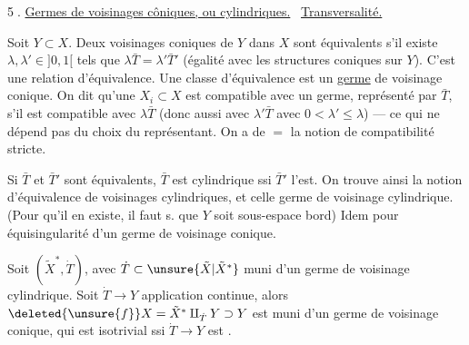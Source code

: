 \textcircled{5.}
\uline{Germes de voisinages côniques, ou cylindriques.}
\ \uline{Transversalité.}

Soit $Y\subset X$. Deux voisinages coniques
 de $Y$ dans
$X$ sont équivalents s'il existe $\lambda,\lambda'\in]0,1[$ tels
que $\lambda\bar T=\lambda'\bar T'$ (égalité 
avec les structures
coniques sur $Y$). C'est une relation d'équivalence.
\margin{$\varepsilon\in]0,1[$, alors pour
$\varepsilon\lambda\bar T=\varepsilon\lambda'\bar T'$}
Une classe d'équivalence est un \uline{germe} de
voisinage conique. On dit qu'une $X_i\subset X$
est compatible avec un germe, représenté par $\bar T$,
s'il est \inserted{$\exists\lambda\in]0,1[$ \deleted{\unsure{telle}}
tel qu'il soit} compatible avec $\lambda\bar T$
(donc aussi avec $\lambda'\bar T$
avec $0<\lambda'\leq\lambda$) --- ce qui ne dépend pas du
choix du représentant. On a de $=$ la
notion de compatibilité stricte.

Si $\bar T$ et $\bar T'$ sont équivalents, 
$\bar T$ est
cylindrique ssi $\bar T'$ l'est. On trouve ainsi la notion
d'équivalence de voisinages cylindriques, et celle 
germe de voisinage cylindrique. (Pour qu'il
en existe, il faut s. que $Y$ soit sous-espace bord)
Idem pour équisingularité d'un germe de
voisinage conique.

Soit $(\tilde X^*,\dot T)$, avec $\dot T\subset\unsure{\tilde X|\tilde X^*}$ muni d'un
germe de voisinage cylindrique. Soit $\dot T\longrightarrow Y$
application continue, alors
$\deleted{\unsure{f}}X=\tilde X^*\amalg_{\dot T}Y\supset Y$
est muni d'un germe de voisinage  conique,
qui est isotrivial ssi $\dot T\longrightarrow Y$ est .
